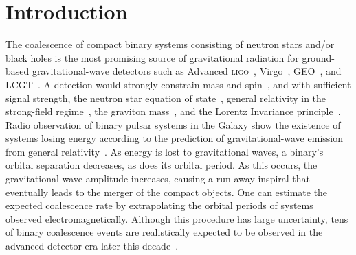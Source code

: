 \section{Introduction}
\label{sec:introduction}



The coalescence of compact binary systems consisting of neutron stars and/or
black holes is the most promising source of gravitational radiation for
ground-based gravitational-wave detectors such as Advanced
\textsc{ligo}~\cite{ALIGOWeb}, Virgo~\cite{AVirgoWeb}, GEO~\cite{GEOWeb}, and
LCGT~\cite{LCGTWeb}.
A detection would strongly constrain mass and
spin~\cite{finn1993,Poisson:1995ef}, and with sufficient signal strength, the
neutron star equation of state~\cite{flanagan:021502,Read:2009}, general
relativity in the strong-field regime~\cite{Will:2005va}, the graviton
mass~\cite{PhysRevD.80.044002,Keppel:2010qu}, and the Lorentz Invariance
principle~\cite{Ellis2006402}.
Radio observation of binary pulsar systems in the Galaxy show the existence of
systems losing energy according to the prediction of gravitational-wave
emission from general relativity~\cite{Taylor:1982,Abadie:2010p10836}. As
energy is lost to gravitational waves, a binary's orbital separation decreases,
as does its orbital period.
As this occurs, the gravitational-wave amplitude increases, causing
a run-away inspiral that eventually leads to the merger of the compact objects.
One can estimate the expected coalescence rate by extrapolating the orbital
periods of systems observed electromagnetically. Although this procedure has
large uncertainty, tens of binary coalescence events are realistically expected
to be observed in the advanced detector era later this
decade~\cite{Abadie:2010p10836}.

